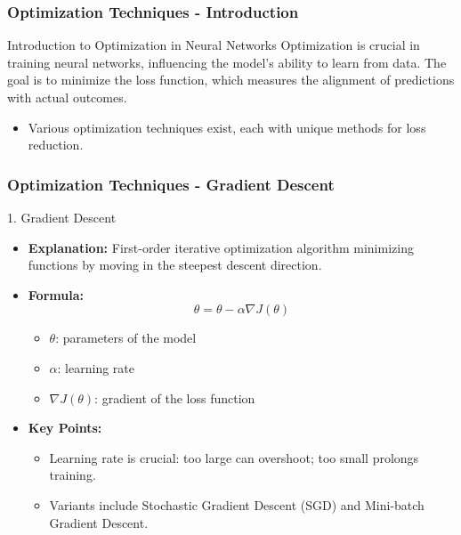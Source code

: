 \documentclass[aspectratio=169]{beamer}
\begin{document}
\begin{frame}[fragile]
    \frametitle{Optimization Techniques - Introduction}
    \begin{block}{Introduction to Optimization in Neural Networks}
        Optimization is crucial in training neural networks, influencing the model's ability to learn from data. The goal is to minimize the loss function, which measures the alignment of predictions with actual outcomes. 
    \end{block}
    \begin{itemize}
        \item Various optimization techniques exist, each with unique methods for loss reduction.
    \end{itemize}
\end{frame}

\begin{frame}[fragile]
    \frametitle{Optimization Techniques - Gradient Descent}
    \begin{block}{1. Gradient Descent}
        \begin{itemize}
            \item \textbf{Explanation:} First-order iterative optimization algorithm minimizing functions by moving in the steepest descent direction.
            \item \textbf{Formula:}
            \begin{equation}
                \theta = \theta - \alpha \nabla J(\theta)
            \end{equation}
            \begin{itemize}
                \item $\theta$: parameters of the model
                \item $\alpha$: learning rate
                \item $\nabla J(\theta)$: gradient of the loss function
            \end{itemize}
            \item \textbf{Key Points:}
            \begin{itemize}
                \item Learning rate is crucial: too large can overshoot; too small prolongs training.
                \item Variants include Stochastic Gradient Descent (SGD) and Mini-batch Gradient Descent.
            \end{itemize}
        \end{itemize}
    \end{block}
\end{frame}
\end{document}
